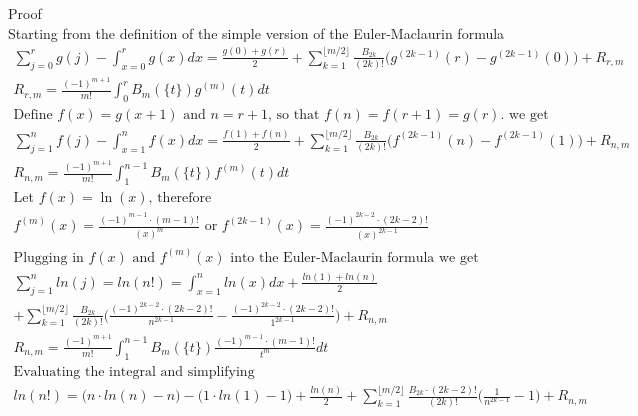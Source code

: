 \documentclass[a4paper]{article}
\begin{document}
\begin{theorem}
        Proof
        \\
        Starting from the definition of the simple version of the Euler-Maclaurin formula
        \begin{gather*}
            \sum_{j=0}^{r} g(j)  - \int_{x=0}^{r} g(x) dx
            =
            \frac{g(0) + g(r)}{2} +
            \sum_{k=1}^{\lfloor m/2 \rfloor} \frac{B_{2k}}{(2k)!} \Big(g^{(2k-1)}(r) - g^{(2k-1)}(0)\Big) + R_{r,m}
            \\
            R_{r,m} = \frac{(-1)^{m+1} }{m!} \int_{0}^{r} B_m(\{t\}) g^{(m)}(t) dt
            \\
            \text{Define $f(x) = g(x+1)$ and $n = r+1$, so that $f(n) = f(r+1) = g(r)$. we get}
            \\
            \sum_{j=1}^{n} f(j)  - \int_{x=1}^{n} f(x) dx
            =
            \frac{f(1) + f(n)}{2} +
            \sum_{k=1}^{\lfloor m/2 \rfloor} \frac{B_{2k}}{(2k)!} \Big(f^{(2k-1)}(n) - f^{(2k-1)}(1)\Big) + R_{n,m}
            \\
            R_{n,m} = \frac{(-1)^{m+1} }{m!} \int_{1}^{n-1} B_m(\{t\}) f^{(m)}(t) dt
        \end{gather*}
        \begin{gather*}
            \text{Let $f(x) = \ln(x)$, therefore}
            \\
            f^{(m)}(x) = \frac{(-1)^{m-1} \cdot (m-1)!}{(x)^m}  \text{  or  }
            f^{(2k-1)}(x) = \frac{(-1)^{2k-2} \cdot (2k-2)!}{(x)^{2k-1}}
            \\
            \text{Plugging in $f(x)$ and $f^{(m)}(x)$ into the Euler-Maclaurin formula we get}
            \\
            \sum_{j=1}^{n} ln(j) = ln(n!) = \int_{x=1}^{n} ln(x) dx
            +
            \frac{ln(1) + ln(n)}{2}
            \\
            + \sum_{k=1}^{\lfloor m/2 \rfloor} \frac{B_{2k}}{(2k)!} \Big(\frac{(-1)^{2k-2} \cdot (2k-2)!}{n^{2k-1}} - \frac{(-1)^{2k-2} \cdot (2k-2)!}{1^{2k-1}}\Big) + R_{n,m}
            \\
            R_{n,m} = \frac{(-1)^{m+1} }{m!} \int_{1}^{n-1} B_m(\{t\}) \frac{(-1)^{m-1} \cdot (m-1)!}{t^m}  dt
            \\
            \text{Evaluating the integral and simplifying}
            \\
            ln(n!) = \big(n \cdot ln(n) - n \big) - \big(1 \cdot ln(1) - 1 \big) +
            \frac{ln(n)}{2}
            + \sum_{k=1}^{\lfloor m/2 \rfloor} \frac{B_{2k} \cdot (2k-2)!}{(2k)!} \Big(\frac{1}{n^{2k-1}} - 1\Big) + R_{n,m}

\end{gather*}
\end{theorem}
\end{document}
